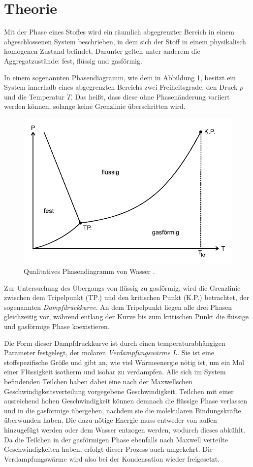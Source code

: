 \section{Theorie}
\label{sec:Theorie}

Mit der Phase eines Stoffes wird ein räumlich abgegrenzter Bereich in einem abgeschlossenen System beschrieben,
in dem sich der Stoff in einem physikalisch homogenen Zustand befindet. 
Darunter gelten unter anderem die Aggregatzustände: fest, flüssig und gasförmig.

In einem sogenannten Phasendiagramm, wie dem in Abbildung \ref{fig:phasendiagramm}, besitzt ein System
innerhalb eines abgegrenzten Bereichs zwei Freiheitsgrade, den Druck $p$ und die Temperatur $T$.
Das heißt, dass diese ohne Phasenänderung variiert werden können, solange keine Grenzlinie überschritten wird.
\begin{figure} 
    \centering
    \includegraphics[width=12cm] {pictures/phasendiagramm.pdf}  
    \caption{Qualitatives Phasendiagramm von Wasser  \cite[1]{v203}.}
    \label{fig:phasendiagramm}
\end{figure}

Zur Untersuchung des Übergangs von flüssig zu gasförmig, wird die Grenzlinie zwischen dem
Tripelpunkt (TP.) und den kritischen Punkt (K.P.) betrachtet, der sogenannten \textit{Dampfdruckkurve}.
An dem Tripelpunkt liegen alle drei Phasen gleichzeitig vor, während entlang der Kurve bis zum
kritischen Punkt die flüssige und gasförmige Phase koexistieren.

Die Form dieser Dampfdruckkurve ist durch einen temperaturabhängigen Parameter festgelegt, 
der molaren \textit{Verdampfungswärme} $L$. 
Sie ist eine stoffspezifische Größe und gibt an, wie viel Wärmeenergie nötig ist, 
um ein Mol einer Flüssigkeit isotherm und isobar zu verdampfen.
Alle sich im System befindenden Teilchen haben dabei eine nach der Maxwellschen Geschwindigkeitsverteilung
vorgegebene Geschwindigkeit. 
Teilchen mit einer ausreichend hohen Geschwindigkeit können demnach die flüssige Phase verlassen und in die
gasförmige übergehen, nachdem sie die molekularen Bindungskräfte überwunden haben.
Die dazu nötige Energie muss entweder von außen hinzugefügt werden oder dem Wasser entzogen werden,
wodurch dieses abkühlt. 
Da die Teilchen in der gasförmigen Phase ebenfalls nach Maxwell verteilte Geschwindigkeiten haben, 
erfolgt dieser Prozess auch umgekehrt. 
Die Verdampfungswärme wird also bei der Kondensation wieder freigesetzt.

